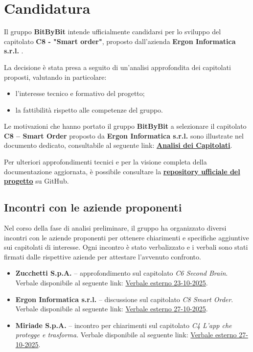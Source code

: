 \documentclass[a4paper,12pt]{article}
\begin{document}
\section{Candidatura}
Il gruppo \textbf{BitByBit} intende ufficialmente candidarsi per lo sviluppo del capitolato \textbf{C8 - "Smart order"}, proposto dall’azienda \textbf{Ergon Informatica s.r.l.} .

La decisione è stata presa a seguito di un’analisi approfondita dei capitolati proposti, valutando in particolare:
\begin{itemize}
    \item l’interesse tecnico e formativo del progetto;
    \item la fattibilità rispetto alle competenze del gruppo.
\end{itemize}


Le motivazioni che hanno portato il gruppo \textbf{BitByBit} a selezionare il capitolato \textbf{C8 – Smart Order} proposto da \textbf{Ergon Informatica s.r.l.} sono illustrate nel documento dedicato, consultabile al seguente link:  
\href{<LINK_ANALISI_CAPITOLATI>}{\textbf{Analisi dei Capitolati}}.

Per ulteriori approfondimenti tecnici e per la visione completa della documentazione aggiornata, è possibile consultare la \href{<LINK_REPOSITORY>}{\textbf{repository ufficiale del progetto}} su GitHub.

\subsection{Incontri con le aziende proponenti}

Nel corso della fase di analisi preliminare, il gruppo ha organizzato diversi incontri con le aziende proponenti per ottenere chiarimenti e specifiche aggiuntive sui capitolati di interesse.  
Ogni incontro è stato verbalizzato e i verbali sono stati firmati dalle rispettive aziende per attestare l’avvenuto confronto.

\begin{itemize}
    \item \textbf{Zucchetti S.p.A.} – approfondimento sul capitolato \emph{C6 Second Brain}.  
    Verbale disponibile al seguente link: \href{<LINK_VERBALE_ZUCCHETTI>}{Verbale esterno 23-10-2025}.
    \item \textbf{Ergon Informatica s.r.l.} – discussione sul capitolato \emph{C8 Smart Order}.  
    Verbale disponibile al seguente link: \href{<LINK_VERBALE_ERGON>}{Verbale esterno 27-10-2025}.
    \item \textbf{Miriade S.p.A.} – incontro per chiarimenti sul capitolato \emph{C4 L’app che protegge e trasforma}.  
    Verbale disponibile al seguente link: \href{<LINK_VERBALE_MIRIADE>}{Verbale esterno 27-10-2025}.
\end{itemize}
\end{document}
